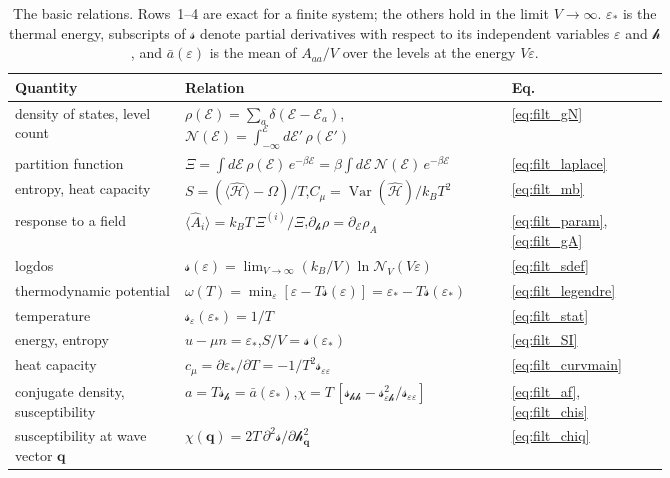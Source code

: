 \documentclass[10pt,a4paper]{article}
\theoremstyle{plain}
\newcommand{\Var}{\operatorname{Var}}
\newcommand{\cN}{\mathcal{N}}   %
\newcommand{\lndos}{{logdos}}  %
\newcommand{\hfield}{\mathscr{h}}  %
\newcommand{\enrg}{\mathcal{E}}  %
\newcommand{\lds}{\mathscr{s}}  %
\begin{document}
\begin{table}[htbp]
\centering
\small
\caption{The basic relations. Rows~1--4 are exact for a finite system; the
others hold in the limit $V\to\infty$. $\varepsilon_*$ is the thermal energy,
subscripts of $\lds$ denote partial derivatives with respect to its
independent variables $\varepsilon$ and $\hfield$, and $\bar a(\varepsilon)$
is the mean of $A_{aa}/V$ over the levels at the energy $V\varepsilon$.}
\label{tab:relations}
\renewcommand{\arraystretch}{1.5}
\begin{tabular}{p{0.26\linewidth}p{0.50\linewidth}l}
\toprule
Quantity & Relation & Eq. \\
\midrule
density of states, level count &
$\rho(\enrg)=\sum_a\delta(\enrg-\enrg_a)$,\quad $\cN(\enrg)=\int_{-\infty}^{\enrg}d\enrg'\,\rho(\enrg')$ & \eqref{eq:filt_gN} \\
partition function &
$\Xi=\int d\enrg\,\rho(\enrg)\,e^{-\beta\enrg}=\beta\int d\enrg\,\cN(\enrg)\,e^{-\beta\enrg}$ & \eqref{eq:filt_laplace} \\
entropy, heat capacity &
$S=(\langle\hat{\mathcal H}\rangle-\Omega)/T$,\quad $C_\mu=\Var(\hat{\mathcal H})/k_BT^{2}$ & \eqref{eq:filt_mb} \\
response to a field &
$\langle\hat A_i\rangle=k_BT\,\Xi^{(i)}/\Xi$,\quad $\partial_\hfield\rho=\partial_\enrg\rho_A$ & \eqref{eq:filt_param}, \eqref{eq:filt_gA} \\
\midrule
\lndos &
$\lds(\varepsilon)=\lim_{V\to\infty}(k_B/V)\ln\cN_V(V\varepsilon)$ & \eqref{eq:filt_sdef} \\
thermodynamic potential &
$\omega(T)=\min_\varepsilon[\varepsilon-T\lds(\varepsilon)]=\varepsilon_*-T\lds(\varepsilon_*)$ & \eqref{eq:filt_legendre} \\
temperature &
$\lds_\varepsilon(\varepsilon_*)=1/T$ & \eqref{eq:filt_stat} \\
energy, entropy &
$u-\mu n=\varepsilon_*$,\quad $S/V=\lds(\varepsilon_*)$ & \eqref{eq:filt_SI} \\
heat capacity &
$c_\mu=\partial\varepsilon_*/\partial T=-1/T^{2}\lds_{\varepsilon\varepsilon}$ & \eqref{eq:filt_curvmain} \\
conjugate density, susceptibility &
$a=T\lds_\hfield=\bar a(\varepsilon_*)$,\quad $\chi=T\,[\lds_{\hfield\hfield}-\lds_{\varepsilon\hfield}^{2}/\lds_{\varepsilon\varepsilon}]$ & \eqref{eq:filt_af}, \eqref{eq:filt_chis} \\
susceptibility at wave vector $\mathbf q$ &
$\chi(\mathbf q)=2T\,\partial^{2}\lds/\partial \hfield_{\mathbf q}^{2}$ & \eqref{eq:filt_chiq} \\
\bottomrule
\end{tabular}
\end{table}
\end{document}
